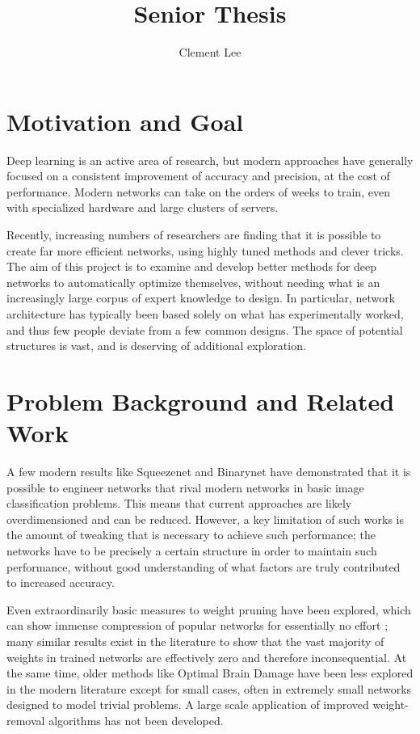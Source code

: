 \documentclass[11pt]{article}
\title{Senior Thesis}
\author{Clement Lee}
\begin{document}
\maketitle
\section*{Motivation and Goal}
  Deep learning is an active area of research, but modern approaches have generally focused on a consistent improvement of accuracy and precision, at the cost of performance.
  Modern networks can take on the orders of weeks to train, even with specialized hardware and large clusters of servers.

  Recently, increasing numbers of researchers are finding that it is possible to create far more efficient networks, using highly tuned methods and clever tricks.
  The aim of this project is to examine and develop better methods for deep networks to automatically optimize themselves, without needing what is an increasingly large corpus of expert knowledge to design.
  In particular, network architecture has typically been based solely on what has experimentally worked, and thus few people deviate from a few common designs.
  The space of potential structures is vast, and is deserving of additional exploration.
\section*{Problem Background and Related Work}
  A few modern results like Squeezenet \cite{iandola2016squeezenet} and Binarynet \cite{courbariaux2016binarynet} have demonstrated that it is possible to engineer networks that rival modern networks in basic image classification problems.
  This means that current approaches are likely overdimensioned and can be reduced.
  However, a key limitation of such works is the amount of tweaking that is necessary to achieve such performance; the networks have to be precisely a certain structure in order to maintain such performance, without good understanding of what factors are truly contributed to increased accuracy.

  Even extraordinarily basic measures to weight pruning have been explored, which can show immense compression of popular networks for essentially no effort \cite{hu2016network}; many similar results exist in the literature to show that the vast majority of weights in trained networks are effectively zero and therefore inconsequential.
  At the same time, older methods like Optimal Brain Damage \cite{lecun1989optimal} have been less explored in the modern literature except for small cases, often in extremely small networks designed to model trivial problems.
  A large scale application of improved weight-removal algorithms has not been developed.
\end{document}
